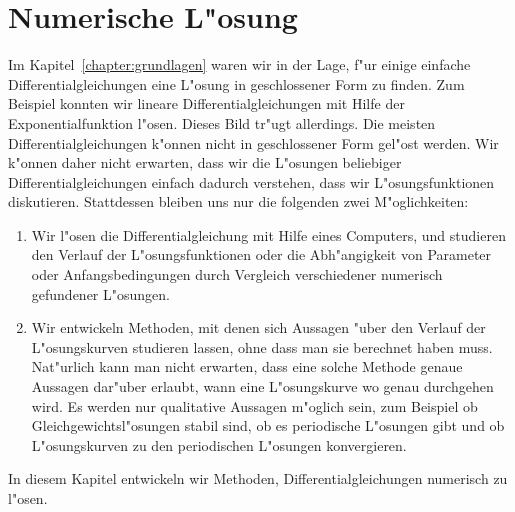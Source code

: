 %
%
%
\chapter{Numerische L"osung\label{chapter:numerik}}
\rhead{}
Im Kapitel~\ref{chapter:grundlagen} waren wir in der Lage, f"ur einige
einfache Differentialgleichungen eine L"osung in geschlossener Form
zu finden.
Zum Beispiel konnten wir lineare Differentialgleichungen mit Hilfe
der Exponentialfunktion l"osen.
Dieses Bild tr"ugt allerdings.
Die meisten Differentialgleichungen k"onnen nicht in geschlossener
Form gel"ost werden.
Wir k"onnen daher nicht erwarten, dass wir die L"osungen beliebiger
Differentialgleichungen einfach dadurch verstehen, dass wir
L"osungsfunktionen diskutieren.
Stattdessen bleiben uns nur die folgenden zwei M"oglichkeiten:
\begin{enumerate}
\item
Wir l"osen die Differentialgleichung mit Hilfe eines Computers,
und studieren den Verlauf der L"osungsfunktionen oder die Abh"angigkeit
von Parameter oder Anfangsbedingungen durch Vergleich verschiedener
numerisch gefundener L"osungen.
\item
Wir entwickeln Methoden, mit denen sich Aussagen "uber den Verlauf der
L"osungskurven studieren lassen, ohne dass man sie berechnet haben muss.
Nat"urlich kann man nicht erwarten, dass eine solche Methode genaue
Aussagen dar"uber erlaubt, wann eine L"osungskurve wo genau durchgehen
wird.
Es werden nur qualitative Aussagen m"oglich sein, zum Beispiel ob
Gleichgewichtsl"osungen stabil sind, ob es periodische L"osungen gibt
und ob L"osungskurven zu den periodischen L"osungen konvergieren.
\end{enumerate}
In diesem Kapitel entwickeln wir Methoden, Differentialgleichungen 
numerisch zu l"osen.

